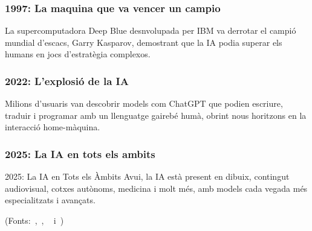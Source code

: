\begin{enumerate}
        \subsubsection{1997: La maquina que va vencer un campio}
         La supercomputadora Deep Blue desnvolupada per IBM va derrotar el campió mundial d’escacs, Garry Kasparov, demostrant que la IA podia superar els humans en jocs d’estratègia complexos.
        \subsubsection{2022: L'explosió de la IA}
         Milions d’usuaris van descobrir models com ChatGPT que podien escriure, traduir i programar amb un llenguatge gairebé humà, obrint nous horitzons en la interacció home-màquina.
        \subsubsection{2025: La IA en tots els ambits}
        2025: La IA en Tots els Àmbits
        Avui, la IA està present en dibuix, contingut audiovisual, cotxes autònoms, medicina i molt més, amb models cada vegada més especialitzats i avançats.

\end{enumerate}

(Fonts:~\cite{McCarthy_Minsky_Rochester_Shannon_2006},~\cite{deep-blue},
~\cite{chatGPT-2022} i~\cite{10.1093/mind/LIX.236.433})

